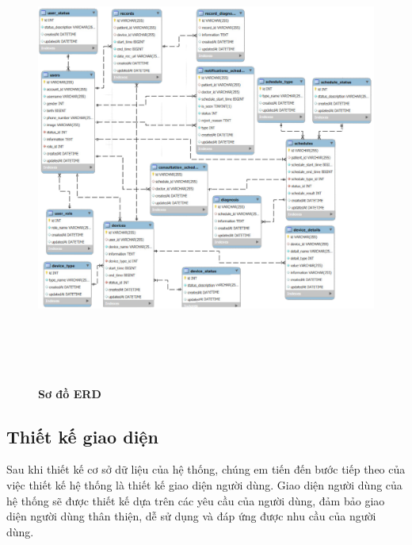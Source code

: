\begin{figure}[H]
	\centering
	\includegraphics[width=15cm,height=15cm]{Images/system/fmECG_database.png}
	\caption[Sơ đồ ERD]{\bfseries \fontsize{12pt}{0pt}\selectfont Sơ đồ ERD}
	\label{fmECG_architecture-Database}
\end{figure}

\subsection{Thiết kế giao diện}
Sau khi thiết kế cơ sở dữ liệu của hệ thống, chúng em tiến đến bước tiếp theo của việc thiết kế hệ thống là thiết kế giao diện người dùng. Giao diện người dùng của hệ thống sẽ được thiết kế dựa trên các yêu cầu của người dùng, đảm bảo giao diện người dùng thân thiện, dễ sử dụng và đáp ứng được nhu cầu của người dùng.
